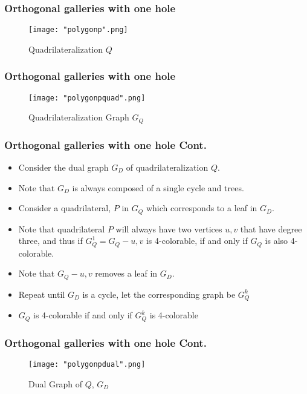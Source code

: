 \documentclass{beamer}
\begin{document}
\begin{frame}
\frametitle{Orthogonal galleries with one hole}
	\begin{center}
	\begin{figure}[H]
	\caption{Quadrilateralization $Q$}
	\centering
	\texttt{[image: "polygonp".png]}
	\end{figure}
	\end{center}
\end{frame}

\begin{frame}
\frametitle{Orthogonal galleries with one hole}
	\begin{center}
	\begin{figure}[H]
	\caption{Quadrilateralization Graph $G_{Q}$}
	\centering
	\texttt{[image: "polygonpquad".png]}
	\end{figure}
	\end{center}
\end{frame}


\begin{frame}
\frametitle{Orthogonal galleries with one hole Cont.}
\begin{itemize}
	\item Consider the dual graph $G_D$ of quadrilateralization $Q$.
	\vfill
	\item Note that $G_D$ is always composed of a single cycle and trees.
	\vfill
	\item Consider a quadrilateral, $P$ in $G_Q$ which corresponds to a leaf in $G_D$.
	\vfill
	\item Note that quadrilateral $P$ will always have two vertices $u,v$ that have degree three, and thus if $G^{1}_Q = G_{Q} - u,v$ is 4-colorable, if and only if $G_{Q}$ is also 4-colorable. 
	\vfill
	\item Note that $G_{Q} - u,v$ removes a leaf in $G_{D}$. 
	\vfill
	\item Repeat until $G_{D}$ is a cycle, let the corresponding graph be $G^{k}_Q$
	\vfill
	\item $G_{Q}$ is 4-colorable if and only if $G^{k}_Q$ is 4-colorable
\end{itemize}
\end{frame}


\begin{frame}
\frametitle{Orthogonal galleries with one hole Cont.}
	\begin{center}
	\begin{figure}[H]
	\caption{Dual Graph of $Q$, $G_D$}
	\centering
	\texttt{[image: "polygonpdual".png]}
	\end{figure}
	\end{center}
\end{frame}
\end{document}
